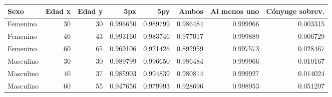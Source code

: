\begin{tabular}{lrrrrrrr}
\toprule
Sexo & Edad x & Edad y & 5px & 5py & Ambos & Al menos uno & Cónyuge sobrev. \\
\midrule
Femenino & 30 & 30 & 0.996650 & 0.989799 & 0.986484 & 0.999966 & 0.003315 \\
Femenino & 40 & 43 & 0.993160 & 0.983746 & 0.977017 & 0.999889 & 0.006729 \\
Femenino & 60 & 65 & 0.969106 & 0.921426 & 0.892959 & 0.997573 & 0.028467 \\
Masculino & 30 & 30 & 0.989799 & 0.996650 & 0.986484 & 0.999966 & 0.010167 \\
Masculino & 40 & 37 & 0.985903 & 0.994839 & 0.980814 & 0.999927 & 0.014024 \\
Masculino & 60 & 55 & 0.947656 & 0.979993 & 0.928696 & 0.998953 & 0.051297 \\
\bottomrule
\end{tabular}
